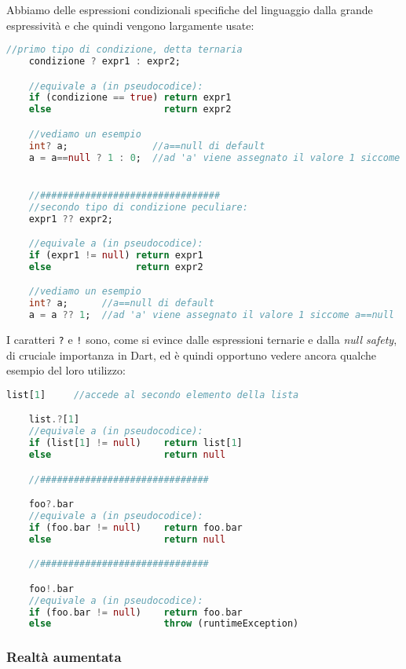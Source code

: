 Abbiamo delle espressioni condizionali specifiche del linguaggio dalla grande espressività e che quindi vengono largamente usate:
\begin{lstlisting}[language=dart, firstnumber=1,caption={Dart espressioni ternarie}]
    //primo tipo di condizione, detta ternaria
    condizione ? expr1 : expr2;

    //equivale a (in pseudocodice):
    if (condizione == true) return expr1
    else                    return expr2

    //vediamo un esempio
    int? a;               //a==null di default
    a = a==null ? 1 : 0;  //ad 'a' viene assegnato il valore 1 siccome a==null


    //################################
    //secondo tipo di condizione peculiare:
    expr1 ?? expr2;

    //equivale a (in pseudocodice):
    if (expr1 != null) return expr1
    else               return expr2

    //vediamo un esempio
    int? a;      //a==null di default
    a = a ?? 1;  //ad 'a' viene assegnato il valore 1 siccome a==null
\end{lstlisting}

I caratteri \verb+?+ e \verb+!+ sono, come si evince dalle espressioni ternarie e dalla \textit{null safety}, di cruciale importanza in Dart, ed è quindi opportuno vedere ancora qualche esempio del loro utilizzo:
\begin{lstlisting}[language=dart, firstnumber=1,caption={Dart operatori '?' e '!'}]
    list[1]     //accede al secondo elemento della lista

    list.?[1]
    //equivale a (in pseudocodice):
    if (list[1] != null)    return list[1]
    else                    return null

    //##############################

    foo?.bar 
    //equivale a (in pseudocodice):
    if (foo.bar != null)    return foo.bar
    else                    return null

    //##############################

    foo!.bar
    //equivale a (in pseudocodice):
    if (foo.bar != null)    return foo.bar
    else                    throw (runtimeException)
\end{lstlisting}


\subsubsection{Realtà aumentata}
